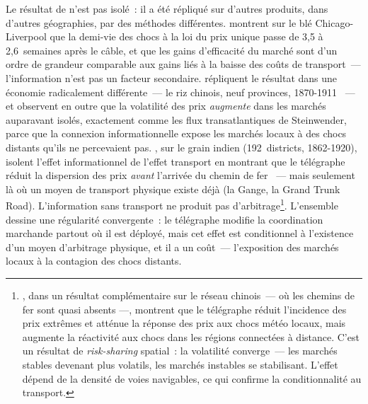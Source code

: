 Le résultat de \textcite{steinwender_real_2018} n'est pas isolé~: il a été répliqué sur d'autres produits, dans d'autres géographies, par des méthodes différentes. \textcite{ejrnaes_gains_2010} montrent sur le blé Chicago-Liverpool que la demi-vie des chocs à la loi du prix unique passe de 3,5 à 2,6~semaines après le câble, et que les gains d'efficacité du marché sont d'un ordre de grandeur comparable aux gains liés à la baisse des coûts de transport~--- l'information n'est pas un facteur secondaire. \textcite{hao_wiring_2022} répliquent le résultat dans une économie radicalement différente~--- le riz chinois, neuf provinces, 1870-1911 ~--- et observent en outre que la volatilité des prix \emph{augmente} dans les marchés auparavant isolés, exactement comme les flux transatlantiques de Steinwender, parce que la connexion informationnelle expose les marchés locaux à des chocs distants qu'ils ne percevaient pas. \textcite{andrabi_information_2021}, sur le grain indien (192~districts, 1862-1920), isolent l'effet informationnel de l'effet transport en montrant que le télégraphe réduit la dispersion des prix \emph{avant} l'arrivée du chemin de fer ~--- mais seulement là où un moyen de transport physique existe déjà (la Gange, la Grand Trunk Road). L'information sans transport ne produit pas d'arbitrage\footnote{\textcite{gao_communication_2021}, dans un résultat complémentaire sur le réseau chinois~--- où les chemins de fer sont quasi absents ---, montrent que le télégraphe réduit l'incidence des prix extrêmes et atténue la réponse des prix aux chocs météo locaux, mais augmente la réactivité aux chocs dans les régions connectées à distance. C'est un résultat de \emph{risk-sharing} spatial~: la volatilité converge~--- les marchés stables devenant plus volatils, les marchés instables se stabilisant. L'effet dépend de la densité de voies navigables, ce qui confirme la conditionnalité au transport.}. %
L'ensemble dessine une régularité convergente~: le télégraphe modifie la coordination marchande partout où il est déployé, mais cet effet est conditionnel à l'existence d'un moyen d'arbitrage physique, et il a un coût~--- l'exposition des marchés locaux à la contagion des chocs distants.


